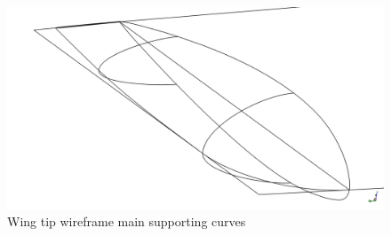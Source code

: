 % 
\begin{figure}[H]
\centering
\includegraphics[scale=0.40]{Immagini/Capitolo3/WingTipWireframeMainSections}
\caption{Wing tip wireframe main supporting curves}
\label{fig:WingTip1}
\end{figure}
% 

